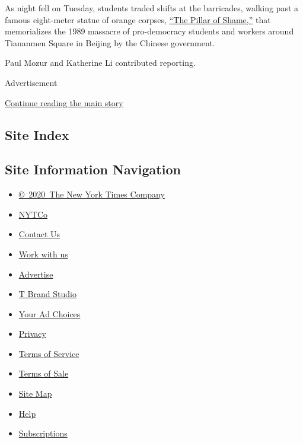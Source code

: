 As night fell on Tuesday, students traded shifts at the barricades,
walking past a famous eight-meter statue of orange corpses,
\href{https://www.hongkongfp.com/2018/05/05/pillar-shame-history-hong-kongs-harrowing-tribute-tiananmen-massacre-victims/}{``The
Pillar of Shame,''} that memorializes the 1989 massacre of pro-democracy
students and workers around Tiananmen Square in Beijing by the Chinese
government.

Paul Mozur and Katherine Li contributed reporting.

Advertisement

\protect\hyperlink{after-bottom}{Continue reading the main story}

\hypertarget{site-index}{%
\subsection{Site Index}\label{site-index}}

\hypertarget{site-information-navigation}{%
\subsection{Site Information
Navigation}\label{site-information-navigation}}

\begin{itemize}
\tightlist
\item
  \href{https://help.nytimes3xbfgragh.onion/hc/en-us/articles/115014792127-Copyright-notice}{©~2020~The
  New York Times Company}
\end{itemize}

\begin{itemize}
\tightlist
\item
  \href{https://www.nytco.com/}{NYTCo}
\item
  \href{https://help.nytimes3xbfgragh.onion/hc/en-us/articles/115015385887-Contact-Us}{Contact
  Us}
\item
  \href{https://www.nytco.com/careers/}{Work with us}
\item
  \href{https://nytmediakit.com/}{Advertise}
\item
  \href{http://www.tbrandstudio.com/}{T Brand Studio}
\item
  \href{https://www.nytimes3xbfgragh.onion/privacy/cookie-policy\#how-do-i-manage-trackers}{Your
  Ad Choices}
\item
  \href{https://www.nytimes3xbfgragh.onion/privacy}{Privacy}
\item
  \href{https://help.nytimes3xbfgragh.onion/hc/en-us/articles/115014893428-Terms-of-service}{Terms
  of Service}
\item
  \href{https://help.nytimes3xbfgragh.onion/hc/en-us/articles/115014893968-Terms-of-sale}{Terms
  of Sale}
\item
  \href{https://spiderbites.nytimes3xbfgragh.onion}{Site Map}
\item
  \href{https://help.nytimes3xbfgragh.onion/hc/en-us}{Help}
\item
  \href{https://www.nytimes3xbfgragh.onion/subscription?campaignId=37WXW}{Subscriptions}
\end{itemize}
